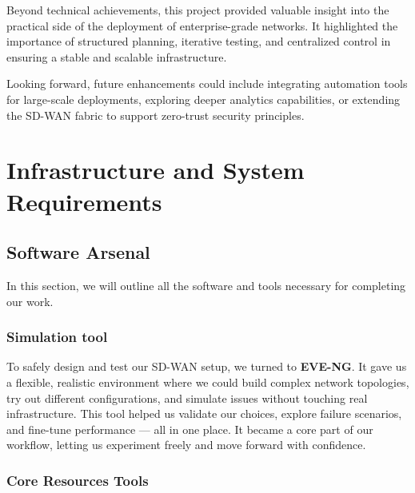 \documentclass[12pt,english]{report}
\begin{document}
Beyond technical achievements, this project provided valuable insight into the practical side of the deployment of enterprise-grade networks. It highlighted the importance of structured planning, iterative testing, and centralized control in ensuring a stable and scalable infrastructure.

Looking forward, future enhancements could include integrating automation tools for large-scale deployments, exploring deeper analytics capabilities, or extending the SD-WAN fabric to support zero-trust security principles.
\newpage
\nocite{*}
\printbibliography[title={References}]

\appendix
\chapter{Infrastructure and System Requirements}
\section{Software Arsenal}
In this section, we will outline all the software and tools necessary for completing our work.
\subsection{Simulation tool}
To safely design and test our SD-WAN setup, we turned to \textbf{EVE-NG}. It gave us a flexible, realistic environment where we could build complex network topologies, try out different configurations, and simulate issues without touching real infrastructure.
This tool helped us validate our choices, explore failure scenarios, and fine-tune performance — all in one place. It became a core part of our workflow, letting us experiment freely and move forward with confidence.

\subsection{Core Resources Tools}
\end{document}
